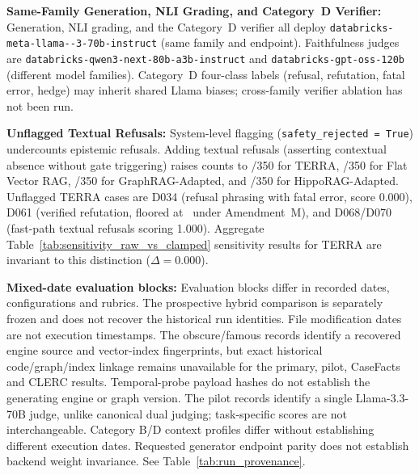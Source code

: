 \item \label{item:samefamily}\textbf{Same-Family Generation, NLI Grading, and Category~D Verifier:}
Generation, NLI grading, and the Category~D verifier all deploy \texttt{databricks-\allowbreak meta-\allowbreak llama--3-70b-\allowbreak instruct} (same family and endpoint). Faithfulness judges are \texttt{databricks-\allowbreak qwen3-next-\allowbreak 80b-a3b-\allowbreak instruct} and \texttt{databricks-\allowbreak gpt-oss-120b} (different model families). Category~D four-class labels (refusal, refutation, fatal error, hedge) may inherit shared Llama biases; cross-family verifier ablation has not been run.

\item \textbf{Unflagged Textual Refusals:}
System-level flagging (\texttt{safety\_rejected = True}) undercounts epistemic refusals. Adding textual refusals (asserting contextual absence without gate triggering) raises counts to \TerraEpistemicRefusals/350 for TERRA, \FlatEpistemicRefusals/350 for Flat Vector RAG, \GraphEpistemicRefusals/350 for GraphRAG-Adapted, and \HippoEpistemicRefusals/350 for HippoRAG-Adapted. Unflagged TERRA cases are D034 (refusal phrasing with fatal error, score 0.000), D061 (verified refutation, floored at \AmendmentMFloorScore\ under Amendment~M), and D068/D070 (fast-path textual refusals scoring 1.000). Aggregate Table~\ref{tab:sensitivity_raw_vs_clamped} sensitivity results for TERRA are invariant to this distinction ($\Delta = 0.000$).

\item \textbf{Mixed-date evaluation blocks:} Evaluation blocks differ in recorded dates, configurations and rubrics. The prospective hybrid comparison is separately frozen and does not recover the historical run identities. File modification dates are not execution timestamps. The obscure/famous records identify a recovered engine source and vector-index fingerprints, but exact historical code/graph/index linkage remains unavailable for the primary, pilot, CaseFacts and CLERC results. Temporal-probe payload hashes do not establish the generating engine or graph version. The pilot records identify a single Llama-3.3-70B judge, unlike canonical dual judging; task-specific scores are not interchangeable. Category B/D context profiles differ without establishing different execution dates. Requested generator endpoint parity does not establish backend weight invariance. See Table~\ref{tab:run_provenance}.

